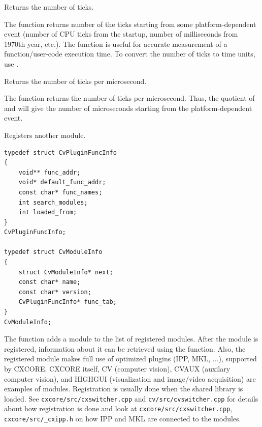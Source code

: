 \fi %

Returns the number of ticks.


The function returns number of the ticks starting from some platform-dependent event (number of CPU ticks from the startup, number of milliseconds from 1970th year, etc.). The function is useful for accurate measurement of a function/user-code execution time. To convert the number of ticks to time units, use .

Returns the number of ticks per microsecond.


The function returns the number of ticks per microsecond. Thus, the quotient of  and  will give the number of microseconds starting from the platform-dependent event.

\ifC %

Registers another module.

\begin{lstlisting}
typedef struct CvPluginFuncInfo
{
    void** func_addr;
    void* default_func_addr;
    const char* func_names;
    int search_modules;
    int loaded_from;
}
CvPluginFuncInfo;

typedef struct CvModuleInfo
{
    struct CvModuleInfo* next;
    const char* name;
    const char* version;
    CvPluginFuncInfo* func_tab;
}
CvModuleInfo;
\end{lstlisting}


\begin{description}
\end{description}

The function adds a module to the list of
registered modules. After the module is registered, information about
it can be retrieved using the  function. Also, the
registered module makes full use of optimized plugins (IPP, MKL, ...),
supported by CXCORE. CXCORE itself, CV (computer vision), CVAUX (auxilary
computer vision), and HIGHGUI (visualization and image/video acquisition) are
examples of modules. Registration is usually done when the shared library
is loaded. See \texttt{cxcore/src/cxswitcher.cpp} and
\texttt{cv/src/cvswitcher.cpp} for details about how registration is done
and look at \texttt{cxcore/src/cxswitcher.cpp}, \texttt{cxcore/src/\_cxipp.h}
on how IPP and MKL are connected to the modules.

